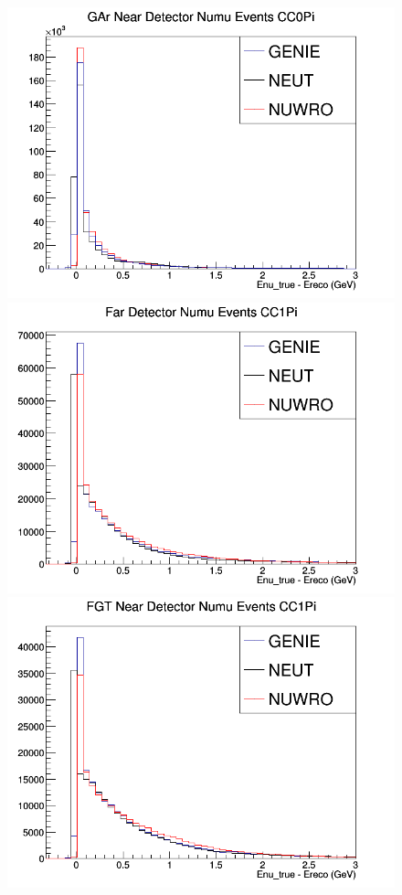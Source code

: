 \documentclass[12pt]{article}
\begin{document}
\begin{figure}[h]
\endminipage
{}
\includegraphics[width=\linewidth]{Ereco_Etrue/numu_GAr_CC0Pi.png}
\endminipage
\newline
{}
\includegraphics[width=\linewidth]{Ereco_Etrue/numu_FD_CC1Pi.png}
\endminipage
{}
\includegraphics[width=\linewidth]{Ereco_Etrue/numu_FGT_CC1Pi.png}

\end{figure}
\end{document}

